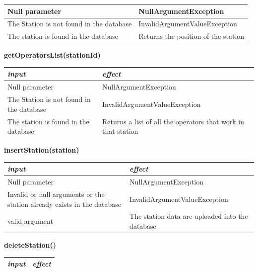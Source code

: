 \documentclass{article}
\begin{document}
\begin{flushleft}
\begin{center}
\begin{tabular}{  |  p{6cm} | p{6cm} |}
    Null parameter & NullArgumentException
     \\ 
  \hline
  The Station is not found in the database & InvalidArgumentValueException \\
  \hline
  The station is found in the database &  Returns the position of the station
  \\
  \hline
    \end{tabular}
\end{center}


  \begin{center}
   \begin {flushleft}
    \textbf{getOperatorsList(stationId)}
    \end{flushleft}
        \begin{tabular}{  |  p{6cm} | p{6cm} |}
    \hline
    \textit{input} &  \textit{effect} \\
    \hline
    
    Null parameter & NullArgumentException
     \\ 
  \hline
   The Station is not found in the database & InvalidArgumentValueException  \\
  \hline
  The station is found in the database& Returns a list of all the operators that work in that station   \\
  \hline
    \end{tabular}
\end{center}


  \begin{center}
   \begin {flushleft}
    \textbf{insertStation(station)}
    \end{flushleft}
        \begin{tabular}{  |  p{6cm} | p{6cm} |}
    \hline
    \textit{input} &  \textit{effect} \\
    \hline
    
     Null parameter & NullArgumentException
     \\ 
  \hline
   Invalid or null arguments or the station already exists in the database &  InvalidArgumentValueException \\
  \hline
  valid argument & The station data are uploaded into the database    \\
  \hline
    \end{tabular}
\end{center}

\newpage

  \begin{center}
   \begin {flushleft}
    \textbf{deleteStation()}
    \end{flushleft}
        \begin{tabular}{  |  p{6cm} | p{6cm} |}
    \hline
    \textit{input} &  \textit{effect} \\
    \hline
    

\end{tabular}
\end{center}
\end{flushleft}
\end{document}
